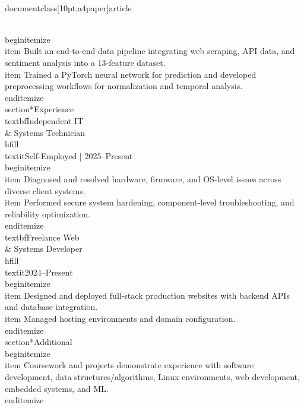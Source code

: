 \\documentclass[10pt,a4paper]{article}
\begin{document}
\\begin{itemize}
    \\item Built an end-to-end data pipeline integrating web scraping, API data, and sentiment analysis into a 13-feature dataset.
    \\item Trained a PyTorch neural network for prediction and developed preprocessing workflows for normalization and temporal analysis.
\\end{itemize}
\\section*{Experience}
\\textbf{Independent IT \\& Systems Technician} \\hfill \\textit{Self-Employed | 2025--Present}
\\begin{itemize}
    \\item Diagnosed and resolved hardware, firmware, and OS-level issues across diverse client systems.
    \\item Performed secure system hardening, component-level troubleshooting, and reliability optimization.
\\end{itemize}
\\textbf{Freelance Web \\& Systems Developer} \\hfill \\textit{2024--Present}
\\begin{itemize}
    \\item Designed and deployed full-stack production websites with backend APIs and database integration.
    \\item Managed hosting environments and domain configuration.
\\end{itemize}
\\section*{Additional}
\\begin{itemize}
    \\item Coursework and projects demonstrate experience with software development, data structures/algorithms, Linux environments, web development, embedded systems, and ML.
\\end{itemize}
\
\end{document}

